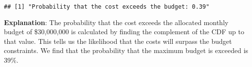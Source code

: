 \documentclass[
  11pt,
]{article}
\begin{document}
\begin{verbatim}
## [1] "Probability that the cost exceeds the budget: 0.39"
\end{verbatim}

\textbf{Explanation}: The probability that the cost exceeds the
allocated monthly budget of \$30,000,000 is calculated by finding the
complement of the CDF up to that value. This tells us the likelihood
that the costs will surpass the budget constraints. We find that the
probability that the maximum budget is exceeded is 39\%.
\end{document}
